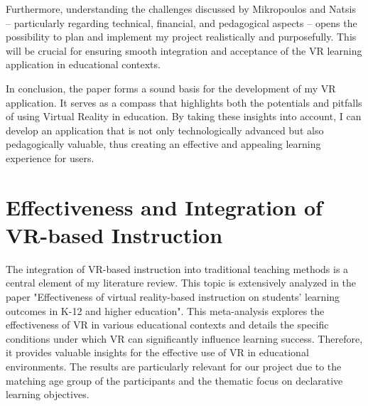 \documentclass[draft, final]{vutinfth} %
\begin{document}
Furthermore, understanding the challenges discussed by Mikropoulos and Natsis -- particularly regarding technical, financial, and pedagogical aspects -- opens the possibility to plan and implement my project realistically and purposefully. This will be crucial for ensuring smooth integration and acceptance of the VR learning application in educational contexts.

In conclusion, the paper forms a sound basis for the development of my VR application. It serves as a compass that highlights both the potentials and pitfalls of using Virtual Reality in education. By taking these insights into account, I can develop an application that is not only technologically advanced but also pedagogically valuable, thus creating an effective and appealing learning experience for users.

\section{Effectiveness and Integration of VR-based Instruction}

The integration of VR-based instruction into traditional teaching methods is a central element of my literature review. This topic is extensively analyzed in the paper "Effectiveness of virtual reality-based instruction on students' learning outcomes in K-12 and higher education"\cite{merchant2014effectiveness}. This meta-analysis explores the effectiveness of VR in various educational contexts and details the specific conditions under which VR can significantly influence learning success. Therefore, it provides valuable insights for the effective use of VR in educational environments. The results are particularly relevant for our project due to the matching age group of the participants and the thematic focus on declarative learning objectives.
\end{document}
